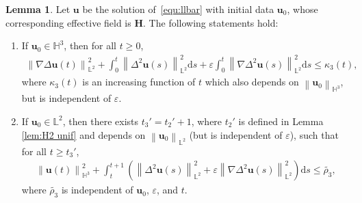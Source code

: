 \documentclass[11pt, reqno]{amsart}
\theoremstyle{definition}
\newtheorem{lemma}[theorem]{Lemma}
\numberwithin{equation}{section}
\newcommand{\bff}{\boldsymbol}
\newcommand{\bb}{\mathbb}
\newcommand{\ds}{\mathrm{d}s}
\newcommand{\norm}[2]{\left\|{#1}\right\|_{#2}}
\begin{document}
\begin{lemma}\label{lem:H3 unif}
Let $\bff{u}$ be the solution of~\eqref{equ:llbar} with initial data $\bff{u}_0$, whose corresponding effective field is $\bff{H}$. The following statements hold:
\begin{enumerate}
\item If $\bff{u}_0\in\bb{H}^3$, then for all $t\geq 0$,
\begin{align}\label{equ:et3 H3}
    \norm{\nabla \Delta \bff{u}(t)}{\bb{L}^2}^2
    +
    \int_0^t \norm{\Delta^2 \bff{u}(s)}{\bb{L}^2}^2 \ds 
    +
    \varepsilon \int_0^t \norm{\nabla \Delta^2 \bff{u}(s)}{\bb{L}^2}^2 \ds 
    \leq
    \kappa_3(t),
\end{align}
where $\kappa_3(t)$ is an increasing function of $t$ which also depends on $\norm{\bff{u}_0}{\bb{H}^3}$, but is independent of $\varepsilon$.
\item If $\bff{u}_0\in \bb{L}^2$, then there exists $t_3'=t_2'+1$, where $t_2'$ is defined in Lemma \ref{lem:H2 unif} and depends on $\norm{\bff{u}_0}{\bb{L}^2}$ (but is independent of $\varepsilon$), such that for all $t\geq t_3'$,
\begin{align}\label{equ:tt1 H3}
    \norm{\bff{u}(t)}{\bb{H}^3}^2 
    +
    \int_t^{t+1} \left( \norm{\Delta^2 \bff{u}(s)}{\bb{L}^2}^2 + \varepsilon \norm{\nabla \Delta^2 \bff{u}(s)}{\bb{L}^2}^2 \right) \ds
    \leq
    \widetilde{\rho_3},
\end{align}
where $\widetilde{\rho_3}$ is independent of $\bff{u}_0$, $\varepsilon$, and $t$.
\end{enumerate}
\end{lemma}
\end{document}
